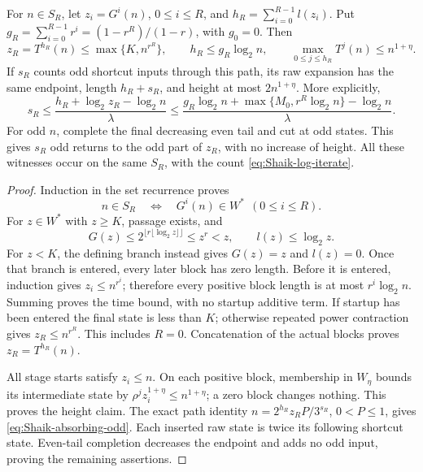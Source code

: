 \begin{proposition}
\label{prop:Shaik-absorbing-startup}
For \(n\in S_R\), let \(z_i=G^i(n)\), \(0\le i\le R\), and
\(h_R=\sum_{i=0}^{R-1}l(z_i)\). Put
\(g_R=\sum_{i=0}^{R-1}r^i=(1-r^R)/(1-r)\), with \(g_0=0\).
Then
\begin{equation}\label{eq:Shaik-absorbing-witness}
 z_R=T^{h_R}(n)\le\max\{K,n^{r^R}\},\qquad
 h_R\le g_R\log_2n,\qquad
 \max_{0\le j\le h_R}T^j(n)\le n^{1+\eta}.
\end{equation}
If \(s_R\) counts odd shortcut inputs through this path, its raw
expansion has the same endpoint, length \(h_R+s_R\), and height at
most \(2n^{1+\eta}\). More explicitly,
\begin{equation}\label{eq:Shaik-absorbing-odd}
 s_R\le
 \frac{h_R+\log_2 z_R-\log_2n}{\lambda}
 \le\frac{g_R\log_2n+\max\{M_0,r^R\log_2n\}-\log_2n}{\lambda}.
\end{equation}
For odd \(n\), complete the final decreasing even tail and cut at odd
states. This gives \(s_R\) odd returns to the odd part of \(z_R\),
with no increase of height.
All these witnesses occur on the same \(S_R\), with the count
\eqref{eq:Shaik-log-iterate}.
\end{proposition}
\begin{proof}
Induction in the set recurrence proves
\[
 n\in S_R\quad\Longleftrightarrow\quad
 G^i(n)\in W^*\ \ (0\le i\le R).
\]
For \(z\in W^*\) with \(z\ge K\), passage exists, and
\[
 G(z)\le 2^{\lfloor r\lfloor\log_2z\rfloor\rfloor}
       \le z^r<z,\qquad l(z)\le\log_2z .
\]
For \(z<K\), the defining branch instead gives \(G(z)=z\) and
\(l(z)=0\). Once that branch is entered, every later block has zero
length. Before it is entered, induction gives
\(z_i\le n^{r^i}\); therefore every positive block length is at most
\(r^i\log_2n\). Summing proves the time bound, with no startup
additive term. If startup has been entered the final state is less
than \(K\); otherwise repeated power contraction gives
\(z_R\le n^{r^R}\). This includes \(R=0\).
Concatenation of the actual blocks proves \(z_R=T^{h_R}(n)\).

All stage starts satisfy \(z_i\le n\). On each positive block,
membership in \(W_\eta\) bounds its intermediate state by
\(\rho^j z_i^{1+\eta}\le n^{1+\eta}\); a zero block changes nothing.
This proves the height claim. The exact path identity
\(n=2^{h_R}z_R P/3^{s_R}\), \(0<P\le1\), gives
\eqref{eq:Shaik-absorbing-odd}. Each inserted raw state is twice its
following shortcut state. Even-tail completion decreases the endpoint
and adds no odd input, proving the remaining assertions.
\end{proof}

